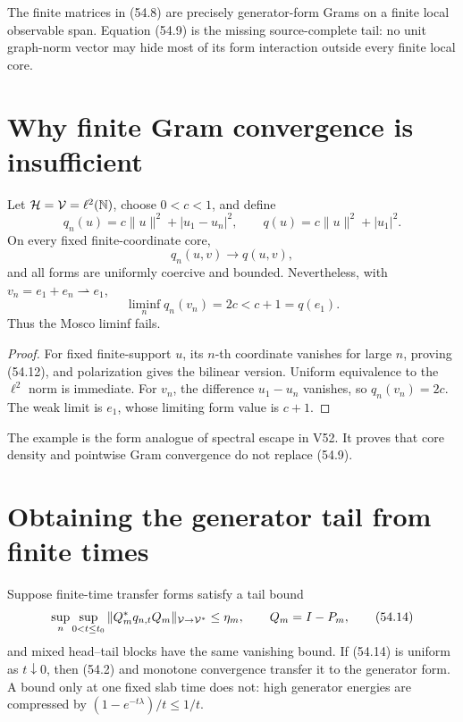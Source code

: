 \documentclass[11pt]{article}
\theoremstyle{remark}
\begin{document}
The finite matrices in (54.8) are precisely generator-form Grams on
a finite local observable span.  Equation (54.9) is the missing
source-complete tail: no unit graph-norm vector may hide most of its
form interaction outside every finite local core.

\section{Why finite Gram convergence is insufficient}

\begin{countertheorem}
\label{cth:v15v54-moving}
Let \({\cal H}={\cal V}=\ell^2(\mathbb N)\), choose
\(0<c<1\), and define
\[
 q_n(u)=c\|u\|^2+|u_1-u_n|^2,\qquad
 q(u)=c\|u\|^2+|u_1|^2.                                \tag{54.11}
\]
On every fixed finite-coordinate core,
\[
 q_n(u,v)\longrightarrow q(u,v),                       \tag{54.12}
\]
and all forms are uniformly coercive and bounded.  Nevertheless,
with \(v_n=e_1+e_n\rightharpoonup e_1\),
\[
 \liminf_nq_n(v_n)=2c<c+1=q(e_1).                       \tag{54.13}
\]
Thus the Mosco liminf fails.
\end{countertheorem}

\begin{proof}
For fixed finite-support \(u\), its \(n\)-th coordinate vanishes for
large \(n\), proving (54.12), and polarization gives the bilinear
version.  Uniform equivalence to the \(\ell^2\) norm is immediate.
For \(v_n\), the difference \(u_1-u_n\) vanishes, so
\(q_n(v_n)=2c\).  The weak limit is \(e_1\), whose limiting form
value is \(c+1\).
\end{proof}

The example is the form analogue of spectral escape in V52.  It
proves that core density and pointwise Gram convergence do not
replace (54.9).

\section{Obtaining the generator tail from finite times}

Suppose finite-time transfer forms satisfy a tail bound
\[
 \sup_n\sup_{0<t\leq t_0}
 \|Q_m^*q_{n,t}Q_m\|_{{\cal V}\to{\cal V}^*}
 \leq\eta_m,\qquad Q_m=I-P_m,                           \tag{54.14}
\]
and mixed head--tail blocks have the same vanishing bound.  If
(54.14) is uniform as \(t\downarrow0\), then (54.2) and monotone
convergence transfer it to the generator form.  A bound only at one
fixed slab time does not: high generator energies are compressed by
\((1-e^{-t\lambda})/t\leq1/t\).
\end{document}
